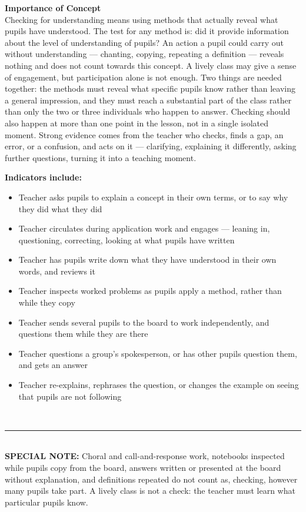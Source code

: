 \documentclass[10pt,a4paper]{article}
\newcommand{\twopane}[2]{%
  \noindent
  \begin{minipage}[t]{0.475\linewidth}\RaggedRight
    {\bfseries\small Importance of Concept}\\[1.4mm]
    \footnotesize #1 \normalsize
  \end{minipage}\hfill
  \begin{minipage}[t]{0.475\linewidth}\RaggedRight
    {\bfseries\small Indicators include:}\\[0.6mm]
    #2
  \end{minipage}\\[2mm]}
\newcommand{\specialnote}[1]{%
  \noindent\textcolor{trule}{\rule{\linewidth}{0.4pt}}\\[1.2mm]
  {\footnotesize\textbf{SPECIAL NOTE:} #1}\\[2mm]}
\begin{document}
\twopane{%
Checking for understanding means using methods that actually reveal what pupils have
understood. The test for any method is: did it provide information about the level of understanding of pupils? An action a 
pupil could carry out without understanding --- chanting, copying, repeating a definition --- reveals nothing and does not count towards this concept. A lively class may give a sense of engagement, but participation alone is not enough. Two things are needed together: the methods must reveal what specific pupils know rather than leaving a general impression, and they must reach a substantial part of the class rather than only the two or three individuals who happen to answer. Checking should also happen at more than one point in the lesson, not in a single isolated moment. Strong evidence comes from the teacher who checks, finds a gap, an error, or a confusion, and acts on it --- clarifying, explaining it differently, asking further questions, turning it into a teaching moment.%
}{%
\footnotesize
\begin{itemize}
  \item Teacher asks pupils to explain a concept in their own terms, or to say why they did what they did
  \item Teacher circulates during application work and engages --- leaning in, questioning, correcting,
        looking at what pupils have written
  \item Teacher has pupils write down what they have understood in their own words, and reviews it
  \item Teacher inspects worked problems as pupils apply a method, rather than while they copy
  \item Teacher sends several pupils to the board to work independently, and questions them while they are there
  \item Teacher questions a group's spokesperson, or has other pupils question them, and gets an answer
  \item Teacher re-explains, rephrases the question, or changes the example on seeing that pupils are not following
\end{itemize}
\normalsize
}
 
\specialnote{Choral and call-and-response work, notebooks inspected while pupils copy from the board, answers written or presented at the board without explanation, and definitions repeated do not count as, checking, however many pupils take part. A lively class is not a check: the teacher must learn what particular pupils know.}
 
\end{document}
